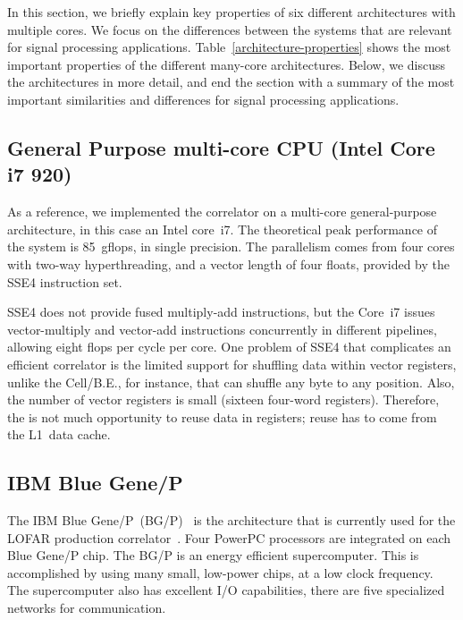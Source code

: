 \documentclass{article}
\begin{document}
In this section, we briefly explain key properties of six different
architectures with multiple cores.  We focus on the differences
between the systems that are relevant for signal processing
applications. Table~\ref{architecture-properties} shows the most
important properties of the different many-core architectures. Below,
we discuss the architectures in more detail, and end the section with
a summary of the most important similarities and differences for signal processing applications.


\subsection{General Purpose multi-core CPU (Intel Core i7 920)}

As a reference, we implemented the correlator on a multi-core
general-purpose architecture, in this case an Intel core~i7.  The
theoretical peak performance of the system is 85~gflops, in single
precision.  The parallelism comes from four cores with two-way
hyperthreading, and a vector length of four floats, provided by the
SSE4 instruction set.

SSE4 does not provide fused multiply-add instructions, but the Core~i7
issues vector-multiply and vector-add instructions concurrently in
different pipelines, allowing eight flops per cycle per core.  One
problem of SSE4 that complicates an efficient correlator is the
limited support for shuffling data within vector registers, unlike the
Cell/B.E., for instance, that can shuffle any byte to any position.
Also, the number of vector registers is small (sixteen four-word
registers).  Therefore, the is not much opportunity to reuse data in
registers; reuse has to come from the L1~data cache. 

\subsection{IBM Blue Gene/P}

The IBM Blue Gene/P~(BG/P)~\cite{IBM:08} is the architecture that is
currently used for the LOFAR production correlator~\cite{Romein:09b}.
Four PowerPC processors are integrated on each Blue Gene/P chip.
The BG/P is an energy efficient supercomputer.
This is accomplished by using many small, low-power chips, at a low clock
frequency.
The supercomputer also has excellent I/O capabilities, there are five
specialized networks for communication.
\end{document}
